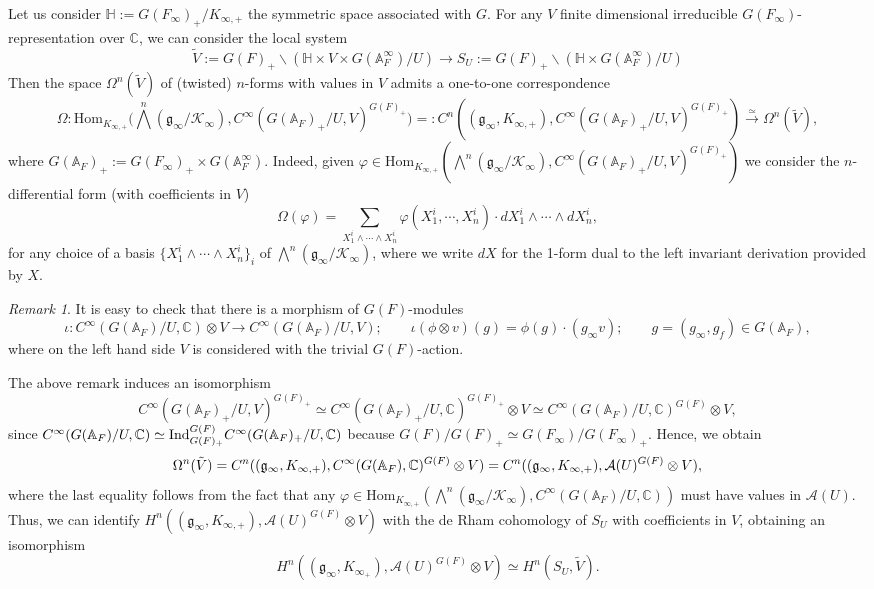 \documentclass{amsart}
\theoremstyle{definition}
\theoremstyle{remark}
\newtheorem{remark}[theorem]{Remark}
\numberwithin{equation}{section}
\newcommand{\A}{{\mathbb A}}
\newcommand{\C}{{\mathbb C}}
\newcommand{\cA}{{\mathcal A}}
\newcommand{\cK}{{\mathcal K}}
\newcommand{\mfg}{{\mathfrak g}}
\newcommand{\Hom}{{\mathrm {Hom}}}
\begin{document}
Let us consider $\mathbb{H}:=G(F_\infty)_+/K_{\infty,+}$ the symmetric space associated with $G$. For any $V$ finite dimensional irreducible $G(F_\infty)$-representation over $\C$, we can consider the local system
\[
\tilde V:=G(F)_+\backslash (\mathbb{H}\times V\times G(\A_F^\infty)/U)\longrightarrow S_U:=G(F)_+\backslash (\mathbb{H}\times G(\A_F^\infty)/U)
\]
Then the space $\Omega^n(\tilde V)$ of (twisted) $n$-forms with values in $V$ admits a one-to-one correspondence
\[
\Omega:\Hom_{K_{\infty,+}}\big(\bigwedge^n(\mfg_\infty/\cK_\infty),C^\infty(G(\A_F)_+/U,V)^{G(F)_+}\big)=:
C^n((\mfg_\infty,K_{\infty,+}),C^\infty(G(\A_F)_+/U,V)^{G(F)_+})\stackrel{\simeq}{\longrightarrow}\Omega^n(\tilde V),
\]
where $G(\A_F)_+:=G(F_\infty)_+\times G(\A_F^\infty)$.
Indeed, given $\varphi\in \Hom_{K_{\infty,+}}\left(\bigwedge^n(\mfg_\infty/\cK_\infty),C^\infty(G(\A_F)_+/U,V)^{G(F)_+}\right)$ we consider the $n$-differential form (with coefficients in $V$)
\[
\Omega(\varphi)=\sum_{X_1^i\wedge\cdots \wedge X_n^i}\varphi(X_1^i,\cdots,X_n^i)\cdot dX_1^i\wedge\cdots\wedge dX_n^i,
\]
for any choice of a basis $\{X_1^i\wedge\cdots \wedge X_n^i\}_i$ of $\bigwedge^n(\mfg_\infty/\cK_\infty)$, where we write $dX$ for the 1-form dual to the left invariant derivation provided by $X$.



\begin{remark}\label{isoCvsCtensV}
It is easy to check that there is a morphism of $G(F)$-modules
    \[
    \iota:C^\infty(G(\A_F)/U,\C)\otimes V\rightarrow C^\infty(G(\A_F)/U,V);\qquad \iota(\phi\otimes v)(g)=\phi(g)\cdot (g_\infty v);\qquad g=(g_\infty,g_f)\in G(\A_F),
    \]
    where on the left hand side $V$ is considered with the trivial $G(F)$-action. 
\end{remark}    
The above remark induces an isomorphism
    \[
   C^\infty(G(\A_F)_+/U,V)^{G(F)_+}\simeq C^\infty(G(\A_F)_+/U,\C)^{G(F)_+}\otimes V\simeq C^\infty(G(\A_F)/U,\C)^{G(F)}\otimes V,
    \]
    since $C^\infty(G(\A_F)/U,\C)\simeq {\rm Ind}_{G(F)_+}^{G(F)}C^\infty(G(\A_F)_+/U,\C)$ because $G(F)/G(F)_+\simeq G(F_\infty)/G(F_\infty)_+$.
Hence, we obtain 
\[
\Omega^n(\tilde V)=C^n((\mfg_\infty,K_{\infty,+}),C^\infty(G(\A_F),\C)^{G(F)}\otimes V)\\
=C^n((\mfg_\infty,K_{\infty,+}),\cA(U)^{G(F)}\otimes V),
\]
where the last equality follows from the fact that any $\varphi\in \Hom_{K_{\infty,+}}\left(\bigwedge^n(\mfg_\infty/\cK_\infty),C^\infty(G(\A_F)/U,\C)\right)$ must have values in $\cA(U)$. Thus, we can identify $H^n((\mfg_\infty,K_{\infty,+}),\cA(U)^{G(F)}\otimes V)$ with the de Rham cohomology of $S_U$ with coefficients in $V$, obtaining an isomorphism
    \begin{equation*}
    H^n((\mfg_\infty,K_{\infty_+}),\cA(U)^{G(F)}\otimes V)\simeq H^n(S_U,\tilde V).%
    \end{equation*}
    
\end{document}
